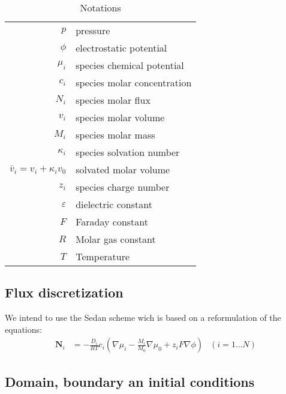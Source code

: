 \documentclass[12pt,oneside,reqno]{amsart}
\numberwithin{equation}{section}
\begin{document}
\begin{table}
  \begin{tabular}{rl}
    $p$ & pressure\\
    $\phi $ &electrostatic potential\\
    $\mu_i$& species chemical potential\\
    $c_i$& species molar concentration\\
    $N_i$& species molar flux\\
    $v_i$ & species molar volume\\ 
    $M_i$ & species molar mass\\
    $\kappa_i$ & species solvation number\\
    $\bar v_i = v_i + \kappa_i v_0$ & solvated molar volume\\
    $z_i$ & species charge number\\
    $\varepsilon$& dielectric constant\\
    $F$ & Faraday constant\\
    $R$ & Molar gas constant\\
    $T$ & Temperature
  \end{tabular}
  \medskip
  
  \caption{Notations}
  \label{tab:notations}
\end{table}

\subsection{Flux discretization}
We intend to use the Sedan scheme wich is based on a reformulation of the equations:
\begin{align*}
  \mathbf N_i &= - \frac{D_i}{RT} c_i \left( \nabla \mu_i - \frac{M_i}{M_0}\nabla \mu_0 + z_i F \nabla \phi \right)& (i=1\dots N) \label{eq:NP}
\end{align*}



\subsection{Domain, boundary an initial conditions} 
\end{document}
